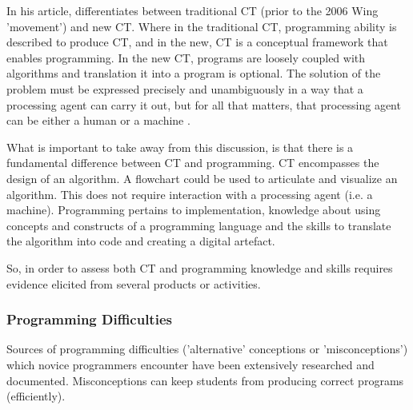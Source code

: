 In his article,  differentiates between traditional CT (prior to the 2006 Wing 'movement') and new CT. Where in the traditional CT, programming ability is described to produce CT, and in the new, CT is a conceptual framework that enables programming. In the new CT, programs are loosely coupled with algorithms and translation it into a program is optional. The solution of the problem must be expressed precisely and unambiguously in a way that a processing agent can carry it out, but for all that matters, that processing agent can be either a human or a machine \cite{corradini2017conceptions}.

What is important to take away from this discussion, is that there is a fundamental difference between CT and programming. CT encompasses the design of an algorithm. A flowchart could be used to articulate and visualize an algorithm. This does not require interaction with a processing agent (i.e. a machine). Programming pertains to implementation, knowledge about using concepts and constructs of a programming language and the skills to translate the algorithm into code and creating a digital artefact.

So, in order to assess both CT and programming knowledge and skills requires evidence elicited from several products or activities.


\subsubsection{Programming Difficulties}
Sources of programming difficulties ('alternative' conceptions or 'misconceptions') which novice programmers encounter have been extensively researched and documented. Misconceptions can keep students from producing correct programs (efficiently).

